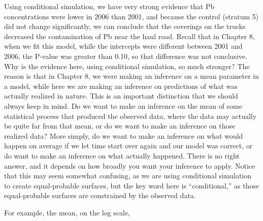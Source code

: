 \documentclass[12pt, titlepage]{article}
\begin{document}
Using conditional simulation, we have very strong evidence that Pb concentrations were lower in 2006 than 2001, and because the control (stratum 5) did not change significantly, we can conclude that the coverings on the trucks decreased the contamination of Pb near the haul road.  Recall that in Chapter 8, when we fit this model, while the intercepts were different between 2001 and 2006, the P-value was greater than 0.10, so that difference was not conclusive.  Why is the evidence here, using conditional simulation, so much stronger?  The reason is that in Chapter 8, we were making an inference on a mean parameter in a model, while here we are making an inference on predictions of what was actually realized in nature.  This is an important distinction that we should always keep in mind.  Do we want to make an inference on the mean of some statistical process that produced the observed data, where the data may actually be quite far from that mean, or do we want to make an inference on those realized data?  More simply, do we want to make an inference on what would happen on average if we let time start over again and our model was correct, or do want to make an inference on what actually happened.  There is no right answer, and it depends on how broadly you want your inference to apply. Notice that this may seem somewhat confusing, as we are using conditional simulation to create equal-probable surfaces, but the key word here is ``conditional,'' as those equal-probable surfaces are constrained by the observed data.

For example, the mean, on the log scale, 





%


%
%
\end{document}
